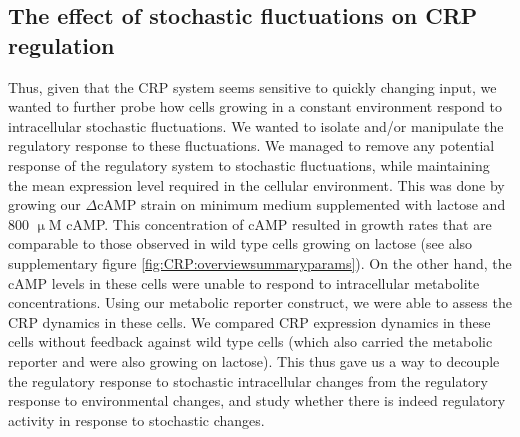 \subsection*{The effect of stochastic fluctuations on CRP regulation}

Thus, given that the CRP system seems sensitive to quickly changing input, we wanted to further probe how cells growing in a constant environment respond to intracellular stochastic fluctuations.
%
%
We wanted to isolate and/or manipulate the regulatory response to these fluctuations.
%
We managed to remove any potential response of the regulatory system to stochastic fluctuations, while maintaining the mean expression level 
required in the cellular environment.
%
This was done by growing our $\Delta$cAMP strain on minimum medium supplemented with lactose and 800 $\upmu$M cAMP.
%
This concentration of cAMP resulted in growth rates that are comparable to those observed in wild type cells growing on lactose (see also supplementary figure \ref{fig:CRP:overviewsummaryparams}).
On the other hand, the cAMP levels in these cells were unable to respond to intracellular metabolite concentrations.
%
Using our metabolic reporter construct, we were able to assess the CRP dynamics in these cells.
We compared CRP expression dynamics in these cells without feedback against wild type cells (which also carried the metabolic reporter and were also growing on lactose).
%
This thus gave us a way to decouple the regulatory response to stochastic intracellular changes from the regulatory response to environmental changes,
and study whether there is indeed regulatory activity in response to stochastic changes.

